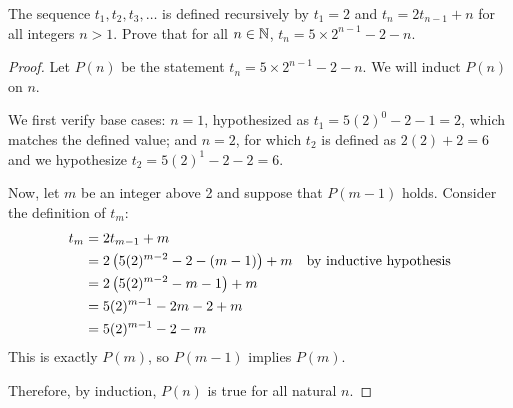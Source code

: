 \question The sequence $t_1, t_2, t_3, \dots$ is defined recursively by
$t_1=2$ and $t_n = 2t_{n-1}+n$ for all integers $n > 1$.
Prove that for all $n\in\mathbb{N}$, $t_n = 5 \times 2^{n-1} - 2 - n$.
\begin{proof}
  Let $P(n)$ be the statement $t_n = 5 \times 2^{n-1} - 2 - n$.
  We will induct $P(n)$ on $n$.

  We first verify base cases: $n = 1$, hypothesized as $t_1 = 5(2)^0-2-1 = 2$, which matches the defined value;
  and $n=2$, for which $t_2$ is defined as $2(2)+2 = 6$ and we hypothesize $t_2 = 5(2)^{1}-2-2 = 6$.

  Now, let $m$ be an integer above 2 and suppose that $P(m-1)$ holds.
  Consider the definition of $t_m$:
  \begin{align*}
    t_m & = 2t_{m-1}+m                                   \\
        & = 2\left( 5(2)^{m-2} - 2 - (m-1) \right)+m & \text{by inductive hypothesis} \\
        & = 2\left( 5(2)^{m-2} - m - 1 \right)+m         \\
        & = 5(2)^{m-1} - 2m - 2 + m                      \\
        & = 5(2)^{m-1} - 2 - m                           \\
  \end{align*}
  This is exactly $P(m)$, so $P(m-1)$ implies $P(m)$.

  Therefore, by induction, $P(n)$ is true for all natural $n$.
\end{proof}


